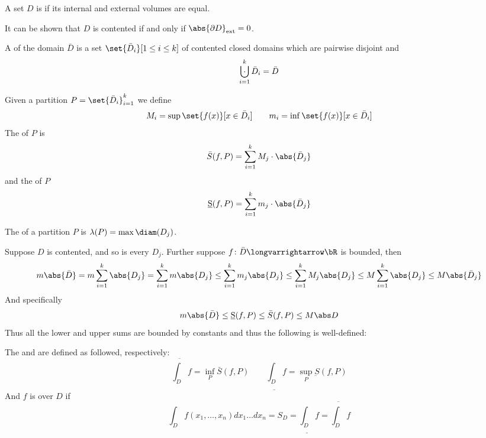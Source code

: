 \documentclass[10pt]{article}
\begin{document}
\begin{defn*}

    A set $D$ is  if its internal and external volumes are equal.

\end{defn*}

It can be shown that $D$ is contented if and only if $\abs{\partial D}_{\rm ext}=0$.

\begin{defn*}

    A  of the domain $\bar D$ is a set $\set{\bar D_i}[1\leq i\leq k]$ of contented closed domains which are pairwise disjoint and
    \[ \bigdcup_{i=1}^k \bar D_i = \bar D \]

\end{defn*}

\begin{defn*}

    Given a partition $P=\set{\bar D_i}_{i=1}^k$ we define
    \[ M_i = \sup\set{f(x)}[x\in\bar D_i] \qquad m_i = \inf\set{f(x)}[x\in\bar D_i] \]
    The  of $P$ is
    \[ \bar S(f,P) = \sum_{i=1}^k M_j\cdot\abs{\bar D_j} \]
    and the  of $P$
    \[ \underbar S(f,P) = \sum_{i=1}^k m_j\cdot\abs{\bar D_j} \]

\end{defn*}

\begin{defn*}

    The  of a partition $P$ is $\lambda(P)=\max\diam(D_j)$.

\end{defn*}


Suppose $D$ is contented, and so is every $D_j$.
Further suppose $f\colon\bar D\longvarrightarrow\bR$ is bounded, then
\[ m\abs{\bar D} = m\sum_{i=1}^k\abs{D_j} = \sum_{i=1}^k m\abs{D_j} \leq \sum_{i=1}^k m_j\abs{D_j} \leq \sum_{i=1}^k M_j\abs{D_j} \leq M\sum_{i=1}^k\abs{D_j} \leq M\abs{\bar D_j} \]
And specifically
\[ m\abs{\bar D} \leq \underbar S(f,P) \leq \bar S(f,P) \leq M\abs D \]
Thus all the lower and upper sums are bounded by constants and thus the following is well-defined:

\begin{defn*}

    The  and  are defined as followed, respectively:
    \[ \overline{\int_D}f = \inf_P\bar S(f,P) \qquad \underline{\int_D} f = \sup_P\underbar S(f,P) \]
    And $f$ is  over $D$ if
    \[ \int_D f(x_1,\dots,x_n)dx_1\dots dx_n = S_D = \underline{\int_D}f = \overline{\int_D}f \]

\end{defn*}
\end{document}
